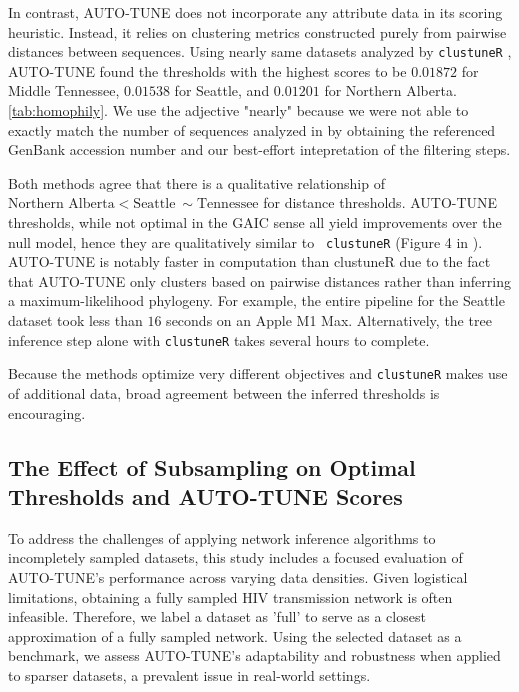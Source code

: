 \documentclass[utf8]{FrontiersinHarvard} %
\begin{document}
In contrast, AUTO-TUNE does not incorporate any attribute data in its scoring
heuristic. Instead, it relies on clustering metrics constructed purely from
pairwise distances between sequences. Using nearly same datasets analyzed by
	{\tt clustuneR} \citep{chato_public_2020}, AUTO-TUNE found the thresholds with
the highest scores to be $0.01872$ for Middle Tennessee, $0.01538$ for Seattle,
and $0.01201$ for Northern Alberta. \autoref{tab:homophily}. We use the
adjective "nearly" because we were not able to exactly match the number of
sequences analyzed in \citet{chato_public_2020} by obtaining the referenced
GenBank accession number and our best-effort intepretation of the filtering
steps.

Both methods agree that there is a qualitative relationship of $\text{Northern
		Alberta} < \text{Seattle} ~\sim \text{Tennessee}$ for distance thresholds.
AUTO-TUNE thresholds, while not optimal in the GAIC sense all yield
improvements over the null model, hence they are qualitatively similar to {\tt
		clustuneR} (Figure 4 in \cite{chato_public_2020}). AUTO-TUNE is notably faster
in computation than clustuneR due to the fact that AUTO-TUNE only clusters
based on pairwise distances rather than inferring a maximum-likelihood
phylogeny. For example, the entire pipeline for the Seattle dataset took less
than $16$ seconds on an Apple M1 Max. Alternatively, the tree inference step
alone with {\tt clustuneR} takes several hours to complete.

Because the methods optimize very different objectives and {\tt clustuneR}
makes use of additional data, broad agreement between the inferred thresholds
is encouraging.

\subsection{The Effect of Subsampling on Optimal Thresholds and AUTO-TUNE Scores}

To address the challenges of applying network inference algorithms to
incompletely sampled datasets, this study includes a focused evaluation of
AUTO-TUNE's performance across varying data densities. Given logistical
limitations, obtaining a fully sampled HIV transmission network is often
infeasible. Therefore, we label a dataset as 'full' to serve as a closest
approximation of a fully sampled network. Using the selected dataset as a
benchmark, we assess AUTO-TUNE's adaptability and robustness when applied to
sparser datasets, a prevalent issue in real-world settings.
\end{document}
